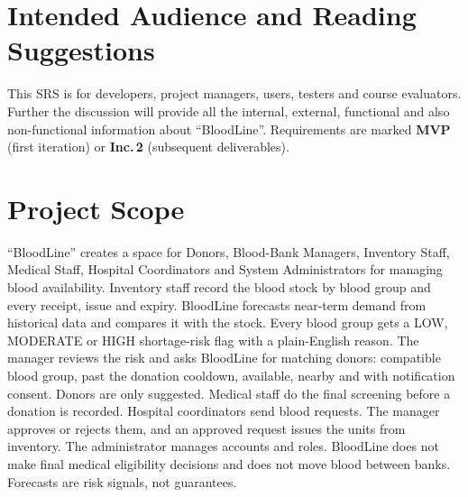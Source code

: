 \documentclass{scrreprt}
\begin{document}
\section{Intended Audience and Reading Suggestions}
This SRS is for developers, project managers, users, testers and course evaluators. Further the discussion will provide all the internal, external, functional and also non-functional information about ``BloodLine''. Requirements are marked \textbf{MVP} (first iteration) or \textbf{Inc.\,2} (subsequent deliverables).

\section{Project Scope}
``BloodLine'' creates a space for Donors, Blood-Bank Managers, Inventory Staff, Medical Staff, Hospital Coordinators and System Administrators for managing blood availability.
\newline
Inventory staff record the blood stock by blood group and every receipt, issue and expiry. BloodLine forecasts near-term demand from historical data and compares it with the stock. Every blood group gets a LOW, MODERATE or HIGH shortage-risk flag with a plain-English reason.
\newline
The manager reviews the risk and asks BloodLine for matching donors: compatible blood group, past the donation cooldown, available, nearby and with notification consent. Donors are only suggested. Medical staff do the final screening before a donation is recorded.
\newline
Hospital coordinators send blood requests. The manager approves or rejects them, and an approved request issues the units from inventory. The administrator manages accounts and roles.
\newline
BloodLine does not make final medical eligibility decisions and does not move blood between banks. Forecasts are risk signals, not guarantees.
\end{document}
